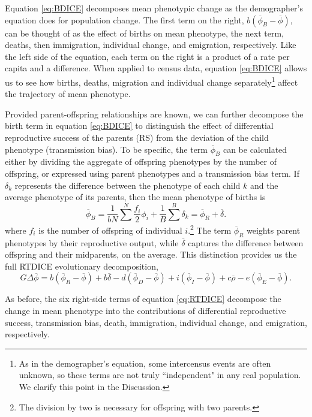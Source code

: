 \documentclass[11pt]{article}
\begin{document}
Equation \ref{eq:BDICE} decomposes mean phenotypic change as the demographer's equation does for population change.  The first term on the right, $b(\overline{\phi}_B - \overline{\phi})$, can be thought of as the effect of births on mean phenotype, the next term, deaths, then immigration, individual change, and emigration, respectively.  Like the left side of the equation, each term on the right is a product of a rate per capita and a difference.  When applied to census data, equation \ref{eq:BDICE} allows us to see how births, deaths, migration and individual change separately\footnote{As in the demographer's equation, some intercensus events are often unknown, so these terms are not truly ``independent" in any real population. We clarify this point in the Discussion.} affect the trajectory of mean phenotype.  

Provided parent-offspring relationships are known, we can further decompose the birth term in equation \ref{eq:BDICE} to distinguish the effect of differential reproductive success of the parents (RS) from the deviation of the child phenotype (transmission bias).  To be specific, the term $\overline{\phi}_B$ can be calculated either by dividing the aggregate of offspring phenotypes by the number of offspring, or expressed using parent phenotypes and a transmission bias term.  If $\delta_k$ represents the difference between the phenotype of each child $k$ and the average phenotype of its parents, then the mean phenotype of births is
  \[\overline{\phi}_B = \frac{1}{bN} \sum^N \frac{f_i}{2} \phi_i + \frac{1}{B} \sum^B \delta_k = \overline{\phi}_{R} + \overline{\delta}.
\]
where $f_i$ is the number of offspring of individual $i$.\footnote{The division by two is necessary for offspring with two parents.}  The term $\overline{\phi}_{R}$ weights parent phenotypes by their reproductive output, while $\overline{\delta}$ captures the difference between offspring and their midparents, on the average.  This distinction provides us the full RTDICE evolutionary decomposition,
\begin{equation}  \label{eq:RTDICE}
G\Delta \overline{\phi} = b(\overline{\phi}_{R} - \overline{\phi}) + b \overline{\delta} - d(\overline{\phi}_D - \overline{\phi}) + i(\overline{\phi}_I - \overline{\phi}) + c \overline{\rho} - e(\overline{\phi}_E - \overline{\phi}).
\end{equation}

As before, the six right-side terms of equation \ref{eq:RTDICE} decompose the change in mean phenotype into the contributions of differential reproductive success, transmission bias, death, immigration, individual change, and emigration, respectively. 
\end{document}

